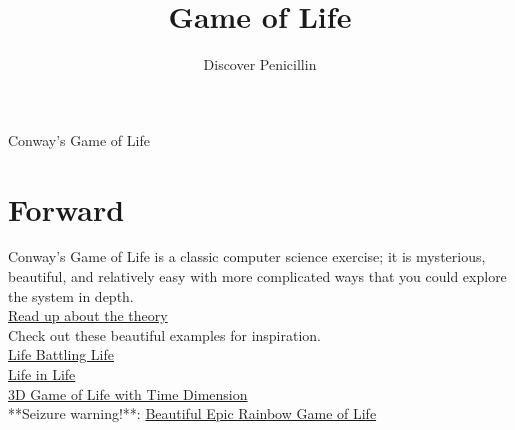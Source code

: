 \documentclass{42-en}
\begin{document}
\title{Game of Life}
\subtitle{Discover Penicillin}


\summary
{
	Conway's Game of Life
}

\maketitle

\tableofcontents


\chapter{Forward}

Conway's Game of Life is a classic computer science exercise; it is mysterious, beautiful, and relatively easy with more complicated ways that you could explore the system in depth.\\

\href{http://web.stanford.edu/~cdebs/GameOfLife/}{Read up about the theory}\\

Check out these beautiful examples for inspiration.\\

\href{https://www.youtube.com/watch?v=-FaqC4h5Ftg}{Life Battling Life}\\

\href{https://www.youtube.com/watch?v=xP5-iIeKXE8}{Life in Life}\\

\href{https://www.youtube.com/watch?v=iiEQg-SHY1g}{3D Game of Life with Time Dimension}\\

**Seizure warning!**: \href{https://www.youtube.com/watch?v=XVVyjIbypwM}{Beautiful Epic Rainbow Game of Life}

\end{document}
